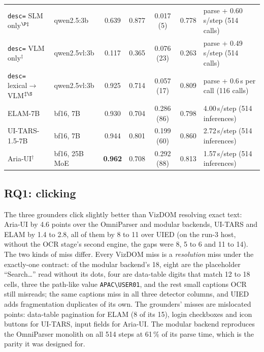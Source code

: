 \documentclass[conference]{IEEEtran}
\newcommand{\code}[1]{\texttt{#1}}
\begin{document}
\begin{table}[t]
{\begin{tabular}{@{}llcccc l@{}}
    \rowcolor{gray!12} \quad \code{desc=} SLM only$^{\P\ddagger}$ & qwen2.5:3b & 0.639 & 0.877 & 0.017 (5) & 0.778 & parse + 0.60\,s/step (514 calls) \\
    \rowcolor{gray!12} \quad \code{desc=} VLM only$^\ddagger$ & qwen2.5vl:3b & 0.117 & 0.365 & 0.076 (23) & 0.263 & parse + 0.49\,s/step (514 calls) \\
    \rowcolor{gray!12} \quad \code{desc=} lexical$\rightarrow$VLM$^{\ddagger\S}$ & qwen2.5vl:3b & 0.925 & 0.714 & 0.057 (17) & 0.809 & parse + 0.6\,s per call (116 calls) \\
    ELAM-7B & bf16, 7B & 0.930 & 0.704 & 0.286 (86) & 0.798 & 4.00\,s/step (514 inferences) \\
    UI-TARS-1.5-7B & bf16, 7B & 0.944 & 0.801 & 0.199 (60) & 0.860 & 2.72\,s/step (514 inferences) \\
    Aria-UI$^\dagger$ & bf16, 25B MoE & \textbf{0.962} & 0.708 & 0.292 (88) & 0.813 & 1.57\,s/step (514 inferences) \\
    \bottomrule
  \end{tabular}}
\end{table}

\subsection{RQ1: clicking}
The three grounders click slightly better than VizDOM resolving exact text: Aria-UI by 4.6 points over the OmniParser and modular backends, UI-TARS and ELAM by 1.4 to 2.8, all of them by 8 to 11 over UIED (on the run-3 host, without the OCR stage's second engine, the gaps were 8, 5 to 6 and 11 to 14). The two kinds of miss differ. Every VizDOM miss is a \emph{resolution} miss under the exactly-one contract: of the modular backend's 18, eight are the placeholder ``Search\ldots'' read without its dots, four are data-table digits that match 12 to 18 cells, three the path-like value \code{APAC\textbackslash USER01}, and the rest small captions OCR still misreads; the same captions miss in all three detector columns, and UIED adds fragmentation duplicates of its own. The grounders' misses are mislocated points: data-table pagination for ELAM (8 of its 15), login checkboxes and icon buttons for UI-TARS, input fields for Aria-UI. The modular backend reproduces the OmniParser monolith on all 514 steps at 61\,\% of its parse time, which is the parity it was designed for.
\end{document}
